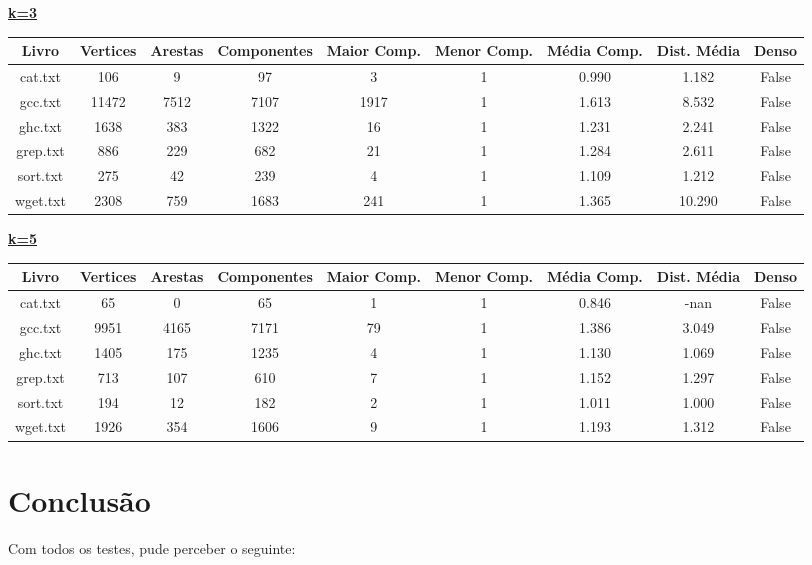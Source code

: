 \documentclass[12pt]{article}
\newcommand{\mytitle}[1]{\textbf{\underline{#1}}}
\begin{document}
\noindent\mytitle{k=3}
\begin{center}
\begin{tabular}{||c | c | c | c | c | c | c | c | c||}
\hline
Livro & Vertices & Arestas & Componentes & Maior Comp. & Menor Comp. & Média Comp. & Dist. Média & Denso \\ [0.5ex]
\hline\hline
cat.txt & 106 & 9 & 97 & 3 & 1 & 0.990 & 1.182 & False \\
\hline
gcc.txt & 11472 & 7512 & 7107 & 1917 & 1 & 1.613 & 8.532 & False \\
\hline
ghc.txt & 1638 & 383 & 1322 & 16 & 1 & 1.231 & 2.241 & False \\
\hline
grep.txt & 886 & 229 & 682 & 21 & 1 & 1.284 & 2.611 & False \\
\hline
sort.txt & 275 & 42 & 239 & 4 & 1 & 1.109 & 1.212 & False \\
\hline
wget.txt & 2308 & 759 & 1683 & 241 & 1 & 1.365 & 10.290 & False \\
\hline
\end{tabular}
\end{center}

\noindent\mytitle{k=5}
\begin{center}
\begin{tabular}{||c | c | c | c | c | c | c | c | c||}
\hline
Livro & Vertices & Arestas & Componentes & Maior Comp. & Menor Comp. & Média Comp. & Dist. Média & Denso \\ [0.5ex]
\hline\hline
cat.txt & 65 & 0 & 65 & 1 & 1 & 0.846 & -nan & False \\
\hline
gcc.txt & 9951 & 4165 & 7171 & 79 & 1 & 1.386 & 3.049 & False \\
\hline
ghc.txt & 1405 & 175 & 1235 & 4 & 1 & 1.130 & 1.069 & False \\
\hline
grep.txt & 713 & 107 & 610 & 7 & 1 & 1.152 & 1.297 & False \\
\hline
sort.txt & 194 & 12 & 182 & 2 & 1 & 1.011 & 1.000 & False \\
\hline
wget.txt & 1926 & 354 & 1606 & 9 & 1 & 1.193 & 1.312 & False \\
\hline
\end{tabular}
\end{center}

\section{Conclusão}

Com todos os testes, pude perceber o seguinte:
\end{document}
